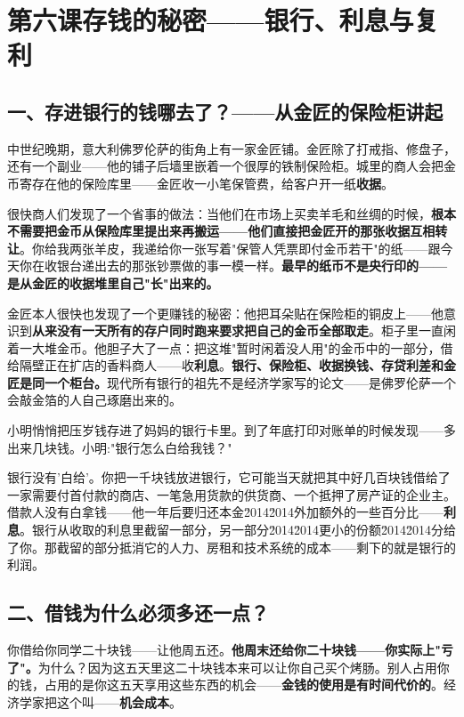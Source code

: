 \documentclass[a4paper,12pt]{ctexart}
\begin{document}
\newpage
\section{\textcolor{orange!80!black}{第六课\quad 存钱的秘密——银行、利息与复利}}

\subsection*{一、存进银行的钱哪去了？——从金匠的保险柜讲起}

中世纪晚期，意大利佛罗伦萨的街角上有一家金匠铺。金匠除了打戒指、修盘子，还有一个副业——他的铺子后墙里嵌着一个很厚的铁制保险柜。城里的商人会把金币寄存在他的保险库里——金匠收一小笔保管费，给客户开一纸\textbf{收据}。

很快商人们发现了一个省事的做法：当他们在市场上买卖羊毛和丝绸的时候，\textbf{根本不需要把金币从保险库里提出来再搬运——他们直接把金匠开的那张收据互相转让}。你给我两张羊皮，我递给你一张写着"保管人凭票即付金币若干"的纸——跟今天你在收银台递出去的那张钞票做的事一模一样。\textbf{最早的纸币不是央行印的——是从金匠的收据堆里自己"长"出来的。}

金匠本人很快也发现了一个更赚钱的秘密：他把耳朵贴在保险柜的铜皮上——他意识到\textbf{从来没有一天所有的存户同时跑来要求把自己的金币全部取走}。柜子里一直闲着一大堆金币。他胆子大了一点：把这堆"暂时闲着没人用"的金币中的一部分，借给隔壁正在扩店的香料商人——收\textbf{利息}。\textbf{银行、保险柜、收据换钱、存贷利差和金匠是同一个柜台。}现代所有银行的祖先不是经济学家写的论文——是佛罗伦萨一个会敲金箔的人自己琢磨出来的。

小明悄悄把压岁钱存进了妈妈的银行卡里。到了年底打印对账单的时候发现——多出来几块钱。小明:"银行怎么白给我钱？"

银行没有'白给'。你把一千块钱放进银行，它可能当天就把其中好几百块钱借给了一家需要付首付款的商店、一笔急用货款的供货商、一个抵押了房产证的企业主。借款人没有白拿钱——他一年后要归还本金\u2014\u2014外加额外的一些百分比——\textbf{利息}。银行从收取的利息里截留一部分，另一部分\u2014\u2014更小的份额\u2014\u2014分给了你。那截留的部分抵消它的人力、房租和技术系统的成本——剩下的就是银行的利润。

\subsection*{二、借钱为什么必须多还一点？}

你借给你同学二十块钱——让他周五还。\textbf{他周末还给你二十块钱——你实际上"亏了"。}为什么？因为这五天里这二十块钱本来可以让你自己买个烤肠。别人占用你的钱，占用的是你这五天享用这些东西的机会——\textbf{金钱的使用是有时间代价的}。经济学家把这个叫——\textbf{机会成本}。
\end{document}
